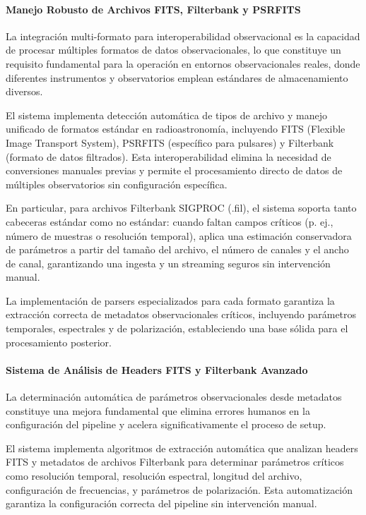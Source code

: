 \paragraph{Manejo Robusto de Archivos FITS, Filterbank y PSRFITS}

La integración multi-formato para interoperabilidad observacional es la capacidad de procesar múltiples formatos de datos observacionales, lo que constituye un requisito fundamental para la operación en entornos observacionales reales, donde diferentes instrumentos y observatorios emplean estándares de almacenamiento diversos.

El sistema implementa detección automática de tipos de archivo y manejo unificado de formatos estándar en radioastronomía, incluyendo FITS (Flexible Image Transport System), PSRFITS (específico para pulsares) y Filterbank (formato de datos filtrados). Esta interoperabilidad elimina la necesidad de conversiones manuales previas y permite el procesamiento directo de datos de múltiples observatorios sin configuración específica.

En particular, para archivos Filterbank SIGPROC (.fil), el sistema soporta tanto cabeceras estándar como no estándar: cuando faltan campos críticos (p. ej., número de muestras o resolución temporal), aplica una estimación conservadora de parámetros a partir del tamaño del archivo, el número de canales y el ancho de canal, garantizando una ingesta y un streaming seguros sin intervención manual.

La implementación de parsers especializados para cada formato garantiza la extracción correcta de metadatos observacionales críticos, incluyendo parámetros temporales, espectrales y de polarización, estableciendo una base sólida para el procesamiento posterior.

\paragraph{Sistema de Análisis de Headers FITS y Filterbank Avanzado}

La determinación automática de parámetros observacionales desde metadatos constituye una mejora fundamental que elimina errores humanos en la configuración del pipeline y acelera significativamente el proceso de setup.

El sistema implementa algoritmos de extracción automática que analizan headers FITS y metadatos de archivos Filterbank para determinar parámetros críticos como resolución temporal, resolución espectral, longitud del archivo, configuración de frecuencias, y parámetros de polarización. Esta automatización garantiza la configuración correcta del pipeline sin intervención manual.

